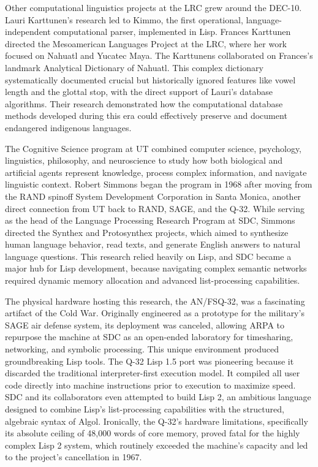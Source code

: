 Other computational linguistics projects at the LRC grew around the DEC-10. Lauri Karttunen’s research led to Kimmo, the first operational, language-independent computational parser, implemented in Lisp. Frances Karttunen directed the Mesoamerican Languages Project at the LRC, where her work focused on Nahuatl and Yucatec Maya. The Karttunens collaborated on Frances's landmark Analytical Dictionary of Nahuatl. This complex dictionary systematically documented crucial but historically ignored features like vowel length and the glottal stop, with the direct support of Lauri’s database algorithms. Their research demonstrated how the computational database methods developed during this era could effectively preserve and document endangered indigenous languages.

The Cognitive Science program at UT combined computer science, psychology, linguistics, philosophy, and neuroscience to study how both biological and artificial agents represent knowledge, process complex information, and navigate linguistic context. Robert Simmons began the program in 1968 after moving from the RAND spinoff System Development Corporation in Santa Monica, another direct connection from UT back to RAND, SAGE, and the Q-32. While serving as the head of the Language Processing Research Program at SDC, Simmons directed the Synthex and Protosynthex projects, which aimed to synthesize human language behavior, read texts, and generate English answers to natural language questions. This research relied heavily on Lisp, and SDC became a major hub for Lisp development, because navigating complex semantic networks required dynamic memory allocation and advanced list-processing capabilities.

The physical hardware hosting this research, the AN/FSQ-32, was a fascinating artifact of the Cold War. Originally engineered as a prototype for the military's SAGE air defense system, its deployment was canceled, allowing ARPA to repurpose the machine at SDC as an open-ended laboratory for timesharing, networking, and symbolic processing. This unique environment produced groundbreaking Lisp tools. The Q-32 Lisp 1.5 port was pioneering because it discarded the traditional interpreter-first execution model. It compiled all user code directly into machine instructions prior to execution to maximize speed. SDC and its collaborators even attempted to build Lisp 2, an ambitious language designed to combine Lisp's list-processing capabilities with the structured, algebraic syntax of Algol. Ironically, the Q-32's hardware limitations, specifically its absolute ceiling of 48,000 words of core memory, proved fatal for the highly complex Lisp 2 system, which routinely exceeded the machine's capacity and led to the project's cancellation in 1967.

